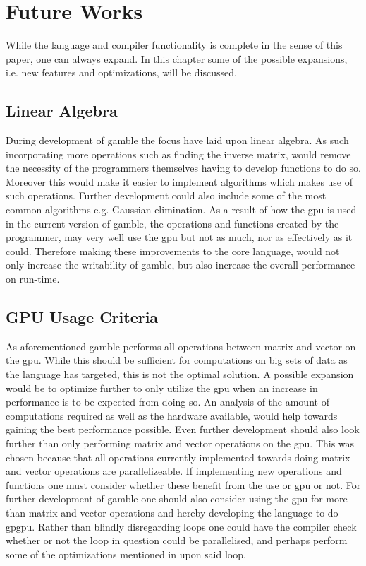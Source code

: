 \chapter{Future Works}\label{cha:future_works}
While the language and compiler functionality is complete in the sense of this paper, one can always expand.
In this chapter some of the possible expansions, i.e. new features and optimizations, will be discussed.

\section{Linear Algebra}\label{improve:LIAL}
During development of \gls{gamble} the focus have laid upon linear algebra.
As such incorporating more operations such as finding the inverse matrix, would remove the necessity of the programmers themselves having to develop functions to do so.
Moreover this would make it easier to implement algorithms which makes use of such operations.
Further development could also include some of the most common algorithms e.g. Gaussian elimination.
As a result of how the \acrshort{gpu} is used in the current version of \gls{gamble}, the operations and functions created by the programmer, may very well use the \acrshort{gpu} but not as much, nor as effectively as it could.
Therefore making these improvements to the core language, would not only increase the writability of \gls{gamble}, but also increase the overall performance on run-time.

\section{GPU Usage Criteria}
As aforementioned \gls{gamble} performs all operations between matrix and vector on the \acrshort{gpu}.
While this should be sufficient for computations on big sets of data as the language has targeted, this is not the optimal solution.
A possible expansion would be to optimize further to only utilize the \acrshort{gpu} when an increase in performance is to be expected from doing so.
An analysis of the amount of computations required as well as the hardware available, would help towards gaining the best performance possible.
Even further development should also look further than only performing matrix and vector operations on the \acrshort{gpu}.
This was chosen because that all operations currently implemented towards doing matrix and vector operations are parallelizeable.
If implementing new operations and functions one must consider whether these benefit from the use or \acrshort{gpu} or not.
For further development of \gls{gamble} one should also consider using the \acrshort{gpu} for more than matrix and vector operations and hereby developing the language to do \acrshort{gpgpu}. 
Rather than blindly disregarding loops one could have the compiler check whether or not the loop in question could be parallelised, and perhaps perform some of the optimizations mentioned in  upon said loop.
 
